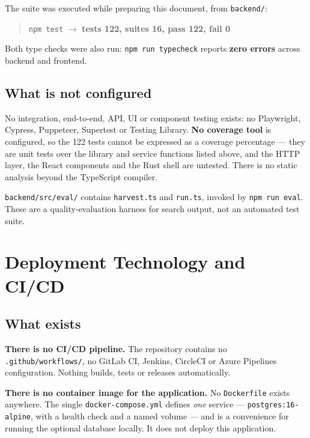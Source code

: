 \documentclass[11pt,a4paper]{report}
\newcommand{\code}[1]{\texttt{\small #1}}
\DeclareRobustCommand{\file}[1]{{\small\nolinkurl{#1}}}
\begin{document}
The suite was executed while preparing this document, from
\file{backend/}:

\begin{quote}
\code{npm test} $\rightarrow$ \textbf{tests 122, suites 16, pass 122, fail 0}
\end{quote}

Both type checks were also run: \code{npm run typecheck} reports \textbf{zero
errors} across backend and frontend.

\section{What is not configured}

No integration, end-to-end, API, UI or component testing exists: no Playwright,
Cypress, Puppeteer, Supertest or Testing Library. \textbf{No coverage tool} is
configured, so the 122 tests cannot be expressed as a coverage percentage --- they
are unit tests over the library and service functions listed above, and the HTTP
layer, the React components and the Rust shell are untested. There is no static
analysis beyond the TypeScript compiler.

\file{backend/src/eval/} contains \code{harvest.ts} and \code{run.ts}, invoked by
\code{npm run eval}. These are a quality-evaluation harness for search output,
not an automated test suite.

\chapter{Deployment Technology and CI/CD}
\label{sec:deploy}

\section{What exists}

\textbf{There is no CI/CD pipeline.} The repository contains no
\file{.github/workflows/}, no GitLab CI, Jenkins, CircleCI or Azure Pipelines
configuration. Nothing builds, tests or releases automatically.

\textbf{There is no container image for the application.} No \file{Dockerfile}
exists anywhere. The single \file{docker-compose.yml} defines \emph{one} service
--- \code{postgres:16-alpine}, with a health check and a named volume --- and is a
convenience for running the optional database locally. It does not deploy this
application.
\end{document}
